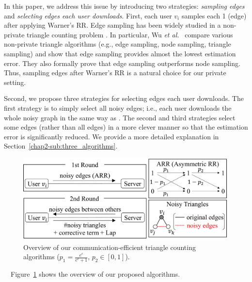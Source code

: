 In this paper, we address this issue by introducing two strategies: \textit{sampling edges} and \textit{selecting edges each user downloads}.
First, each user $v_i$ samples each 1 (edge) after applying Warner's RR.
Edge sampling has been widely studied in a
non-private triangle counting problem \cite{Bera_PODS20,Eden_FOCS15,Tsourakakis_KDD09,Wu_TKDE16}.
In particular, Wu \textit{et al.}~\cite{Wu_TKDE16} compare various non-private triangle algorithms (e.g., edge sampling, node sampling, triangle sampling) and show that edge sampling provides almost the lowest estimation error.
They also formally prove that edge sampling outperforms node sampling.
Thus, sampling edges after Warner's RR is a natural choice for our private setting.

Second, we propose three strategies for selecting edges each user downloads.
The first strategy is to simply select all noisy edges; i.e., each user downloads the whole noisy graph in the same way as \cite{Imola_USENIX21}.
The second and third strategies select some edges (rather than all edges) in a more clever manner so that the estimation error is significantly reduced.
We provide a more detailed explanation in Section~\ref{chap2-sub:three_algorithms}.

\begin{figure}[t]
  \centering
  \includegraphics[width=0.99\linewidth]{fig/algorithm_overview.pdf}
  \vspace{-4mm}
  \caption{Overview of our communication-efficient triangle counting algorithms
  ($p_1 =\frac{e^{\epsilon}}{e^{\epsilon}+1}$,
  $p_2 \in [0,1]$).}
  \label{chap2-fig:alg_overview}
\end{figure}

\smallskip
{}~~Figure~\ref{chap2-fig:alg_overview} shows the overview of our proposed algorithms.

